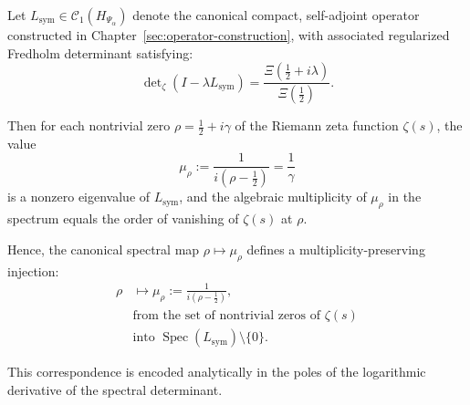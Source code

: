 \begin{lemma}
\label{lem:zero-to-eigenvalue-injection}
Let \( L_{\mathrm{sym}} \in \mathcal{C}_1(H_{\Psi_\alpha}) \) denote the canonical compact, self-adjoint operator constructed in Chapter~\ref{sec:operator-construction}, with associated regularized Fredholm determinant satisfying:
\[
\det\nolimits_\zeta(I - \lambda L_{\mathrm{sym}})
= \frac{\Xi\left(\tfrac{1}{2} + i\lambda\right)}{\Xi\left(\tfrac{1}{2}\right)}.
\]

Then for each nontrivial zero \( \rho = \tfrac{1}{2} + i\gamma \) of the Riemann zeta function \( \zeta(s) \), the value
\[
\mu_\rho := \frac{1}{i(\rho - \tfrac{1}{2})} = \frac{1}{\gamma}
\]
is a nonzero eigenvalue of \( L_{\mathrm{sym}} \), and the algebraic multiplicity of \( \mu_\rho \) in the spectrum equals the order of vanishing of \( \zeta(s) \) at \( \rho \).

\medskip
\noindent
Hence, the canonical spectral map \( \rho \mapsto \mu_\rho \) defines a multiplicity-preserving injection:
\[
\begin{aligned}
\rho &\longmapsto \mu_\rho := \frac{1}{i(\rho - \tfrac{1}{2})}, \\
&\text{from the set of nontrivial zeros of } \zeta(s) \\
&\text{into } \operatorname{Spec}(L_{\mathrm{sym}}) \setminus \{0\}.
\end{aligned}
\]

\noindent
This correspondence is encoded analytically in the poles of the logarithmic derivative of the spectral determinant.
\end{lemma}
% 